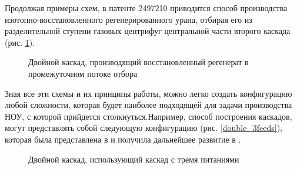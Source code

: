 Продолжая примеры схем, в патенте 2497210 \cite{SposobIzotopnogoVosstanovleniyac} приводится способ производства изотопно-восстановленного регенерированного урана, отбирая его из разделительной ступени газовых центрифуг центральной части второго каскада (рис. \ref{fig:double_crazy}).
\begin{figure}[ht]
  \caption{Двойной каскад, производящий восстановленный регенерат в промежуточном потоке отбора}\label{fig:double_crazy}
\end{figure}

Зная все эти схемы и их принципы работы, можно легко создать конфигурацию любой сложности, которая будет наиболее подходящей для задачи производства НОУ, с которой прийдется столкнуться.Например, способ построения каскадов, могут представлять собой следующую конфигурацию (рис. \ref{double_3feeds}), которая была представлена в \cite{smirnovDilutionRecycledUranium2015} и получила дальнейшее развитие в \cite{smirnovEvaluatingEffectivenessDilution2016}.
\begin{figure}[ht]
  \caption{Двойной каскад, использующий каскад с тремя питаниями}\label{fig:double_3feeds}
\end{figure}

